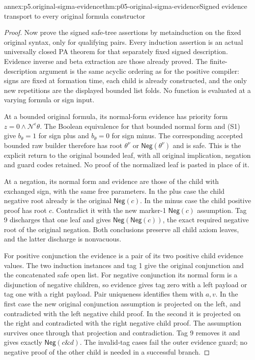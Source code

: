 \begin{annexitem}{annex:p5.original-sigma-evidence}{thm:p05-original-sigma-evidence}{Signed evidence transport to every original formula constructor}
\begin{proof}
Now prove the signed safe-tree assertions by metainduction on the
fixed original syntax, only for qualifying pairs. Every induction
assertion is an actual universally closed PA theorem for that
separately fixed signed description. Evidence inverse and beta
extraction are those already proved. The finite-description argument
is the same acyclic ordering as for the positive compiler: signs
are fixed at formation time, each child is already constructed,
and the only new repetitions are the displayed bounded list folds.
No function is evaluated at a varying formula or sign input.

At a bounded original formula, its normal-form evidence has priority
form \(z=0\land\mathcal N^\epsilon\theta\). The Boolean
equivalence for that bounded normal form and (S1) give
\(b_\theta=1\) for sign plus and \(b_\theta=0\) for sign
minus. The corresponding accepted bounded raw builder therefore
has root \(\theta^\nu\) or \(\mathsf{Neg}(\theta^\nu)\)
and is safe. This is the explicit return to the original bounded
leaf, with all original implication, negation and guard codes
retained. No proof of the normalized leaf is pasted in place of it.

At a negation, its normal form and evidence are those of the child
with exchanged sign, with the same free parameters. In the plus
case the child negative root already is the original
\(\mathsf{Neg}(c)\). In the minus case the child positive proof
has root \(c\). Contradict it with the new marker-1
\(\mathsf{Neg}(c)\) assumption. Tag 9 discharges that one leaf
and gives \(\mathsf{Neg}(\mathsf{Neg}(c))\), the exact required
negative root of the original negation. Both conclusions preserve
all child axiom leaves, and the latter discharge is nonvacuous.

For positive conjunction the evidence is a pair of its two positive
child evidence values. The two induction instances and tag 1 give
the original conjunction and the concatenated safe open list.
For negative conjunction its normal form is a disjunction of
negative children, so evidence gives tag zero with a left payload
or tag one with a right payload. Pair uniqueness identifies them
with \(a,v\). In the first case the new original conjunction
assumption is projected on the left, and contradicted with the
left negative child proof. In the second it is projected on the
right and contradicted with the right negative child proof.
The assumption survives once through that projection and
contradiction. Tag 9 removes it and gives exactly
\(\mathsf{Neg}(c\mathbin{\&}d)\). The invalid-tag cases fail
the outer evidence guard; no negative proof of the other child
is needed in a successful branch.


\end{proof}
\end{annexitem}
